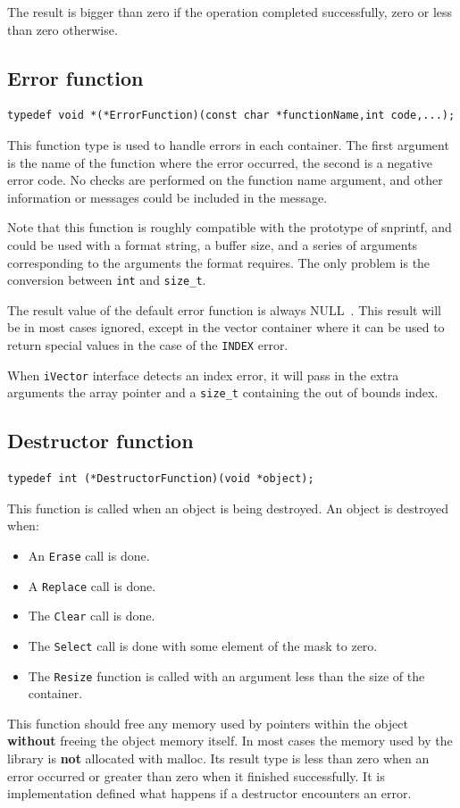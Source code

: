\documentclass[12pt,a4paper,openany]{memoir} %
\newif\iftth
\newcommand{\Null}{{\iftth \ NULL \else \footnotesize NULL\  \fi}}
\begin{document}
The result is bigger than zero if the operation completed successfully, zero or less than zero otherwise.
\subsection{Error function}
\begin{verbatim}
typedef void *(*ErrorFunction)(const char *functionName,int code,...);
\end{verbatim}
This function type is used to handle errors in each container. The first argument is the name of the function where the error occurred, the second is a 
negative error code. No checks are performed on the function name argument, and other information or messages could be included in the message.

Note that this function is roughly compatible with the prototype of snprintf, and could be used with a format string, a buffer size, and a series of 
arguments corresponding to the arguments the format requires. The only problem is the conversion between \verb,int, and \verb,size_t,.

The result value of the default error function is always \Null. This result will be in most cases ignored, except in the vector container where
it can be used to return special values in the case of the \verb,INDEX, error.

When \verb,iVector, interface detects an index error, it will pass in the extra arguments the array pointer and a \verb,size_t, containing 
the out of bounds index.
\subsection{Destructor function}
\begin{verbatim}
typedef int (*DestructorFunction)(void *object);
\end{verbatim}
This function is called when an object is being destroyed. An object is destroyed when:
\begin{itemize}
\item An \texttt{Erase} call is done.
\item A \texttt{Replace} call is done.
\item The \texttt{Clear} call is done.
\item The \texttt{Select} call is done with some element of the mask to zero.
\item The \texttt{Resize} function is called with an argument less than the size of the container.
\end{itemize}
This function should free any memory used by pointers within the object \textbf{without} freeing the object memory itself. In most cases the memory
used by the library is \textbf{not} allocated with malloc. Its result type is less than zero when an error occurred or greater than zero when
it finished successfully. It is implementation defined what happens if a destructor encounters an error.
\end{document}
